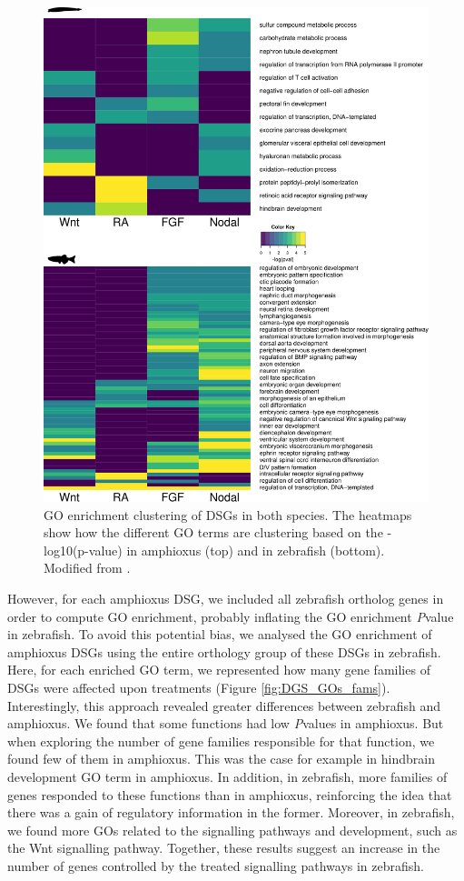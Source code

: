\begin{figure}[hp]
\centering
\includegraphics[width=1\textwidth]{Figures/DSG_GOs_pval}
\caption[GO enrichment clustering of DSGs in both species]{GO enrichment clustering of DSGs in both species. The heatmaps show how the different GO terms are clustering based on the -log10(p-value) in amphioxus (top) and in zebrafish (bottom). Modified from \parencite{gil-galvez_gain_2022}.
}
\label{fig:DGS_GOs_pval}
\end{figure} 

However, for each amphioxus DSG, we included all zebrafish ortholog genes in order to compute GO enrichment, probably inflating the GO enrichment \textit{P}value in zebrafish. To avoid this potential bias, we analysed the GO enrichment of amphioxus DSGs using the entire orthology group of these DSGs in zebrafish. Here, for each enriched GO term, we represented how many gene families of DSGs were affected upon treatments (Figure \ref{fig:DGS_GOs_fams}). Interestingly, this approach revealed greater differences between zebrafish and amphioxus. We found that some functions had low \textit{P}values in amphioxus. But when exploring the number of gene families responsible for that function, we found few of them in amphioxus. This was the case for example in hindbrain development GO term in amphioxus. In addition, in zebrafish, more families of genes responded to these functions than in amphioxus, reinforcing the idea that there was a gain of regulatory information in the former. Moreover, in zebrafish, we found more GOs related to the signalling pathways and development, such as the Wnt signalling pathway. Together, these results suggest an increase in the number of genes controlled by the treated signalling pathways in zebrafish.

